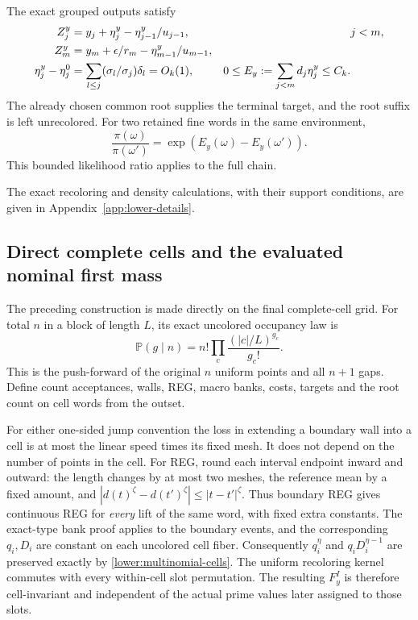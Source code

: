 The exact grouped outputs satisfy
\begin{align}
 Z_j^y&=y_j+\eta_j^y-\eta_{j-1}^y/u_{j-1},&&j<m,\notag\\
 Z_m^y&=y_m+\epsilon/r_m-\eta_{m-1}^y/u_{m-1},\notag\\
 \eta_j^y-\eta_j^0
     &=\sum_{l\leq j}(\sigma_l/\sigma_j)\delta_l=O_k(1),
 &0\leq E_y:=\sum_{j<m}d_j\eta_j^y\leq C_k.
 \label{lower:exact-outputs}
\end{align}
The already chosen common root supplies the terminal target, and the
root suffix is left unrecolored.  For two retained fine words in the same environment,
\begin{equation}
 \frac{\pi(\omega)}{\pi(\omega')}
       =\exp(E_y(\omega)-E_y(\omega')).
 \label{lower:relative-rn}
\end{equation}
This bounded likelihood ratio applies to the full chain.

The exact recoloring and density calculations, with their support
conditions, are given in Appendix~\ref{app:lower-details}.

\subsection{Direct complete cells and the evaluated nominal first mass}
\label{lower:cells}
The preceding construction is made directly on the final complete-cell
grid.
For total $n$ in a block of length $L$, its exact uncolored occupancy law
is
\begin{equation}
 \mathbb P(g\mid n)=n!\prod_c
           \frac{(|c|/L)^{g_c}}{g_c!}.
 \label{lower:multinomial-cells}
\end{equation}
This is the push-forward of the original $n$ uniform points and all
$n+1$ gaps.  Define count acceptances, walls, REG, macro banks, costs,
targets and the root count on cell words from the outset.

For either one-sided jump convention the loss in extending a boundary
wall into a cell is at most the linear speed times its fixed mesh.
It does not depend on the number of points in the cell.  For REG,
round each interval endpoint inward and outward: the length changes
by at most two meshes, the reference mean by a fixed amount, and
$|d(t)^\zeta-d(t')^\zeta|\leq|t-t'|^\zeta$.
Thus boundary REG gives continuous REG for \emph{every} lift of the
same word, with fixed extra constants.  The exact-type bank proof
applies to the boundary events, and the corresponding $q_i,D_i$ are
constant on each uncolored cell fiber.  Consequently $q_i^\eta$ and
$q_iD_i^{\eta-1}$ are preserved exactly by
\eqref{lower:multinomial-cells}.
The uniform recoloring kernel commutes with every within-cell slot
permutation.  The resulting $F_y^I$ is therefore cell-invariant and
independent of the actual prime values later assigned to those slots.

